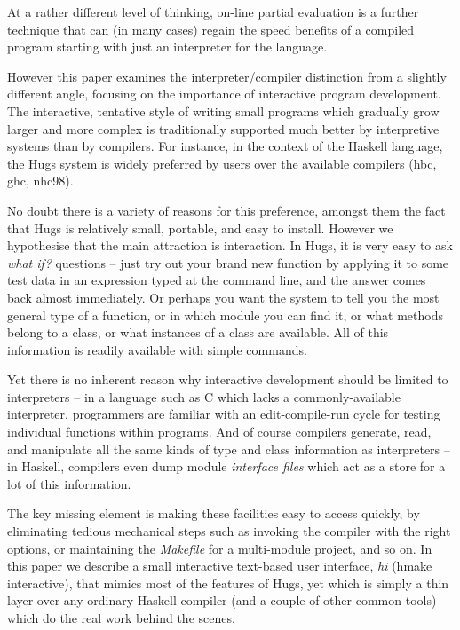 \documentclass[a4paper]{llncs}
\begin{document}
At a rather different level of thinking, on-line partial evaluation
is a further technique that can (in many cases) regain the speed
benefits of a compiled program starting with just an interpreter for
the language.

However this paper examines the interpreter/compiler distinction from
a slightly different angle, focusing on the importance of interactive
program development.  The interactive, tentative style of writing small
programs which gradually grow larger and more complex is traditionally
supported much better by interpretive systems than by compilers.
For instance, in the context of the Haskell language, the Hugs
system is widely preferred by users over the available compilers
(hbc, ghc, nhc98).

No doubt there is a variety of reasons for this preference,
amongst them the fact that Hugs is relatively small, portable, and
easy to install.  However we hypothesise that the main attraction
is interaction.  In Hugs, it is very easy to ask {\em what if?}
questions -- just try out your brand new function by applying it
to some test data in an expression typed at the command line, and
the answer comes back almost immediately.  Or perhaps you want the
system to tell you the most general type of a function, or in which
module you can find it, or what methods belong to a class, or what
instances of a class are available.  All of this information is
readily available with simple commands.

Yet there is no inherent reason why interactive development should
be limited to interpreters -- in a language such as C which lacks
a commonly-available interpreter, programmers are familiar with
an edit-compile-run cycle for testing individual functions within
programs.  And of course compilers generate, read, and manipulate
all the same kinds of type and class information as interpreters --
in Haskell, compilers even dump module {\em interface files} which
act as a store for a lot of this information.

The key missing element is making these facilities easy to access
quickly, by eliminating tedious mechanical steps such as invoking the
compiler with the right options, or maintaining the {\em Makefile} for
a multi-module project, and so on.  In this paper we describe a small
interactive text-based user interface, {\em hi} (hmake interactive),
that mimics most of the features of Hugs, yet which is simply a thin
layer over any ordinary Haskell compiler (and a couple of other common
tools) which do the real work behind the scenes.
\end{document}
